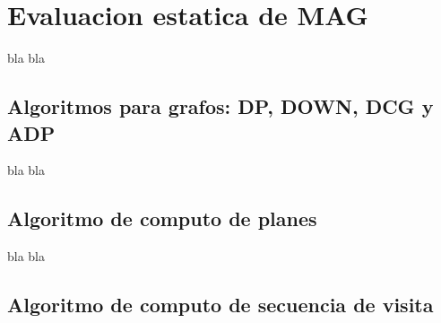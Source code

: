 \chapter{Evaluacion estatica de MAG }
\label{chap:eval_est}
\minitoc


bla bla

\section{Algoritmos para grafos: DP, DOWN, DCG y ADP}
bla bla

\section{Algoritmo de computo de planes}

bla bla

\section{Algoritmo de computo de secuencia de visita}

